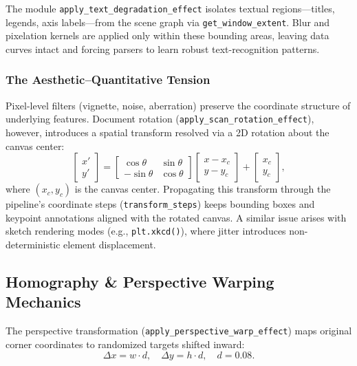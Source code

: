 \documentclass[11pt,twocolumn]{article}
\begin{document}
The module \texttt{apply\_text\_degradation\_effect} isolates textual regions---titles, legends, axis labels---from the scene graph via \texttt{get\_window\_extent}.
Blur and pixelation kernels are applied only within these bounding areas, leaving data curves intact and forcing parsers to learn robust text-recognition patterns.

\subsubsection{The Aesthetic--Quantitative Tension}\label{sec:tension}

Pixel-level filters (vignette, noise, aberration) preserve the coordinate structure of underlying features.
Document rotation (\texttt{apply\_scan\_rotation\_effect}), however, introduces a spatial transform resolved via a 2D rotation about the canvas center:
\begin{equation}\label{eq:rotation_matrix}
  \begin{bmatrix} x' \\ y' \end{bmatrix} = \begin{bmatrix} \cos\theta & \sin\theta \\ -\sin\theta & \cos\theta \end{bmatrix} \begin{bmatrix} x - x_c \\ y - y_c \end{bmatrix} + \begin{bmatrix} x_c \\ y_c \end{bmatrix},
\end{equation}
where $(x_c, y_c)$ is the canvas center. Propagating this transform through the pipeline's coordinate steps (\texttt{transform\_steps}) keeps bounding boxes and keypoint annotations aligned with the rotated canvas.
A similar issue arises with sketch rendering modes (e.g., \texttt{plt.xkcd()}), where jitter introduces non-deterministic element displacement.

\subsection{Homography \& Perspective Warping Mechanics}\label{sec:homography}

The perspective transformation (\texttt{apply\_perspective\_warp\_effect}) maps original corner coordinates to randomized targets shifted inward:
\begin{equation}\label{eq:distortion}
  \Delta x = w \cdot d,\quad \Delta y = h \cdot d,\quad d = 0.08.
\end{equation}
\end{document}

